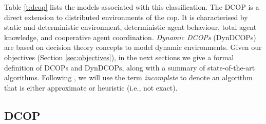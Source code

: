Table \ref{t:dcop} lists the models associated with this classification. The DCOP is a
direct extension to distributed environments of the \gls{cop}. It is characterised by
static and deterministic environment, deterministic agent behaviour, total agent
knowledge, and cooperative agent coordination. \emph{Dynamic DCOPs} (DynDCOPs) are based on
decision theory concepts to model dynamic environments.
Given our objectives (Section \ref{sec:objectives}), in the next sections we give a formal
definition of DCOPs and DynDCOPs, along with a summary of state-of-the-art algorithms.
Following \cite[Section $4.3$]{fioretto2018survey}, we will use the term \emph{incomplete}
to denote an algorithm that is either approximate or heuristic (i.e., not exact).

\subsection{DCOP}\label{sec:dcop}

